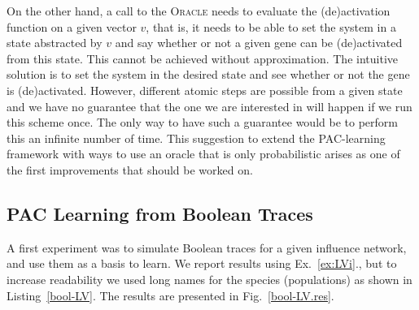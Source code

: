 \documentclass{llncs}
\begin{document}
On the other hand, a call to the \textsc{Oracle}  needs to evaluate the (de)activation function on a given vector $v$, that is, it needs to be able to set the system in a state abstracted by $v$ and say whether or not a given gene can be (de)activated from this state.
This cannot be achieved without approximation.
The intuitive solution is to set the system in the desired state and see whether or not the gene is (de)activated. 
However, different atomic steps are possible from a given state and we have no guarantee that the one we are interested in will happen if we run this scheme once. The only way to have such a guarantee would be to perform this an infinite number of time.
This suggestion to extend the PAC-learning framework with ways to use an oracle that is only probabilistic arises as one of the first improvements that should be worked on.



\subsection{PAC Learning from Boolean Traces}

A first experiment was to simulate Boolean traces for a given influence network, and use them as a basis to learn.
We report results using
Ex.~\ref{ex:LVi}., but to increase readability we used long names for the
species (populations) as shown in Listing~\ref{bool-LV}.
The results are presented in Fig.~\ref{bool-LV.res}.
\end{document}
